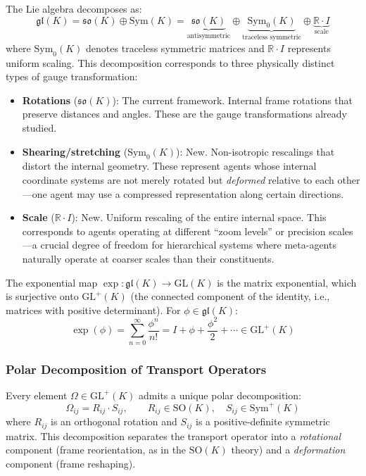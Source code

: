 \documentclass[11pt]{article}
\begin{document}
The Lie algebra decomposes as:
\begin{equation}
\mathfrak{gl}(K) = \mathfrak{so}(K) \oplus \mathrm{Sym}(K) = \underbrace{\mathfrak{so}(K)}_{\text{antisymmetric}} \oplus \underbrace{\mathrm{Sym}_0(K)}_{\text{traceless symmetric}} \oplus \underbrace{\mathbb{R} \cdot I}_{\text{scale}}
\end{equation}
where $\mathrm{Sym}_0(K)$ denotes traceless symmetric matrices and $\mathbb{R} \cdot I$ represents uniform scaling. This decomposition corresponds to three physically distinct types of gauge transformation:

\begin{itemize}
\item \textbf{Rotations} ($\mathfrak{so}(K)$): The current framework. Internal frame rotations that preserve distances and angles. These are the gauge transformations already studied.

\item \textbf{Shearing/stretching} ($\mathrm{Sym}_0(K)$): New. Non-isotropic rescalings that distort the internal geometry. These represent agents whose internal coordinate systems are not merely rotated but \emph{deformed} relative to each other---one agent may use a compressed representation along certain directions.

\item \textbf{Scale} ($\mathbb{R} \cdot I$): New. Uniform rescaling of the entire internal space. This corresponds to agents operating at different ``zoom levels'' or precision scales---a crucial degree of freedom for hierarchical systems where meta-agents naturally operate at coarser scales than their constituents.
\end{itemize}

The exponential map $\exp: \mathfrak{gl}(K) \to \mathrm{GL}(K)$ is the matrix exponential, which is surjective onto $\mathrm{GL}^+(K)$ (the connected component of the identity, i.e., matrices with positive determinant). For $\phi \in \mathfrak{gl}(K)$:
\begin{equation}
\exp(\phi) = \sum_{n=0}^{\infty} \frac{\phi^n}{n!} = I + \phi + \frac{\phi^2}{2} + \cdots \in \mathrm{GL}^+(K)
\end{equation}

\subsubsection{Polar Decomposition of Transport Operators}

Every element $\Omega \in \mathrm{GL}^+(K)$ admits a unique polar decomposition:
\begin{equation}
\boxed{\Omega_{ij} = R_{ij} \cdot S_{ij}, \qquad R_{ij} \in \mathrm{SO}(K), \quad S_{ij} \in \mathrm{Sym}^+(K)}
\end{equation}
where $R_{ij}$ is an orthogonal rotation and $S_{ij}$ is a positive-definite symmetric matrix. This decomposition separates the transport operator into a \emph{rotational} component (frame reorientation, as in the $\mathrm{SO}(K)$ theory) and a \emph{deformation} component (frame reshaping).
\end{document}
